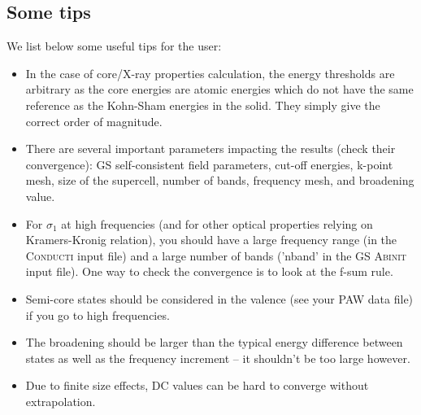 \documentclass[a4,12pts]{extarticle}
\begin{document}
\subsection{Some tips}
We list below some useful tips for the user:
\begin{itemize}
\item In the case of core/X-ray properties calculation, the energy thresholds are arbitrary as the core energies are atomic energies which do not have the same reference as the Kohn-Sham energies in the solid. They simply give the correct order of magnitude.
\item There are several important parameters impacting the results (check their convergence): GS self-consistent field parameters, cut-off energies, k-point mesh, size of the supercell, number of bands, frequency mesh, and broadening value.
\item For $\sigma_1$ at high frequencies (and for other optical properties relying on Kramers-Kronig relation), you should have a large frequency range (in the \textsc{Conducti} input file) and a large number of bands ('nband' in the GS \textsc{Abinit} input file). One way to check the convergence is to look at the f-sum rule.
\item Semi-core states should be considered in the valence (see your PAW data file) if you go to high frequencies.
\item The broadening should be larger than the typical energy difference between states as well as the frequency increment -- it shouldn't be too large however.
\item Due to finite size effects, DC values can be hard to converge without extrapolation.
\end{itemize}


\end{document}
